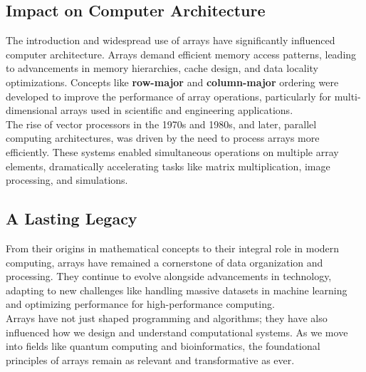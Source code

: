 \documentclass[12pt, oneside]{book}
\begin{document}
\subsection{Impact on Computer Architecture}
The introduction and widespread use of arrays have significantly influenced computer architecture. Arrays demand efficient memory access patterns, leading to advancements in memory hierarchies, cache design, and data locality optimizations. Concepts like \textbf{row-major} and \textbf{column-major} ordering were developed to improve the performance of array operations, particularly for multi-dimensional arrays used in scientific and engineering applications.\\
The rise of vector processors in the 1970s and 1980s, and later, parallel computing architectures, was driven by the need to process arrays more efficiently. These systems enabled simultaneous operations on multiple array elements, dramatically accelerating tasks like matrix multiplication, image processing, and simulations.\\
\subsection{A Lasting Legacy}
From their origins in mathematical concepts to their integral role in modern computing, arrays have remained a cornerstone of data organization and processing. They continue to evolve alongside advancements in technology, adapting to new challenges like handling massive datasets in machine learning and optimizing performance for high-performance computing.\\
Arrays have not just shaped programming and algorithms; they have also influenced how we design and understand computational systems. As we move into fields like quantum computing and bioinformatics, the foundational principles of arrays remain as relevant and transformative as ever.
\end{document}
